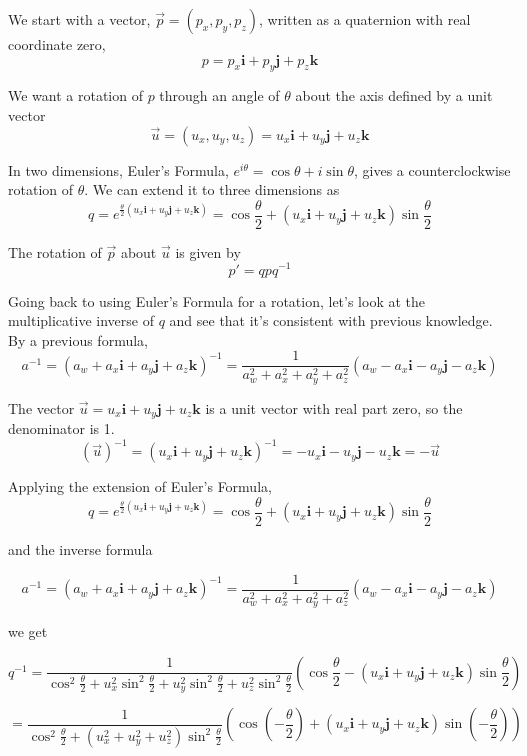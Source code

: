 \documentclass[12pt]{article}
\begin{document}
\begin{spacing}{1.2}
We start with a vector, $\vec{p} = (p_x, p_y, p_z)$, written as a quaternion with real coordinate zero, 
$$p = p_x \mathbf{i} + p_y \mathbf{j} + p_z \mathbf{k}$$

We want a rotation of $p$ through an angle of $\theta$ about the axis defined by a unit vector $$\vec{u} =  ( u_x, u_y, u_z ) = u_x \mathbf{i} + u_y \mathbf{j} + u_z \mathbf{k}$$ 

In two dimensions, Euler's Formula,  $e^{i\theta} = \cos \theta + i \sin \theta$, gives a counterclockwise rotation of $\theta$.  We can extend it to three dimensions as
$$q = e^{ 
	\frac{\theta}{2}
	( u_x \mathbf{i} + u_y \mathbf{j} + u_z \mathbf{k} )
	}
=
	\cos \frac{\theta}{2} + ( u_x \mathbf{i} + u_y \mathbf{j} + u_z \mathbf{k} ) \sin \frac{\theta}{2}
$$

The rotation of $\vec{p}$ about $\vec{u}$ is given by 
$$p' = q p q^{-1}$$

Going back to using Euler's Formula for a rotation, let's look at the multiplicative inverse of $q$ and see that it's consistent with previous knowledge.  By a previous formula, 
$$a^{-1} = (a_w + a_x \mathbf{i} + a_y \mathbf{j} + a_z \mathbf{k})^{-1} = 
\frac{1}{a_w^2 + a_x^2 + a_y^2 + a_z^2} (a_w - a_x \mathbf{i} - a_y \mathbf{j} - a_z \mathbf{k} )$$

The vector $\vec{u} = u_x \mathbf{i} + u_y \mathbf{j} + u_z \mathbf{k}$ is a unit vector with real part zero, so the denominator is 1.  
$$(\vec{u})^{-1} = (u_x \mathbf{i} + u_y \mathbf{j} + u_z \mathbf{k})^{-1} = -u_x \mathbf{i} - u_y \mathbf{j} - u_z \mathbf{k} = -\vec{u}$$

Applying the extension of Euler's Formula, 
$$q = e^{ 
	\frac{\theta}{2}
	( u_x \mathbf{i} + u_y \mathbf{j} + u_z \mathbf{k} )
	}
=
	\cos \frac{\theta}{2} + ( u_x \mathbf{i} + u_y \mathbf{j} + u_z \mathbf{k} ) \sin \frac{\theta}{2}
$$

and the inverse formula

$$a^{-1} = (a_w + a_x \mathbf{i} + a_y \mathbf{j} + a_z \mathbf{k})^{-1} = 
\frac{1}{a_w^2 + a_x^2 + a_y^2 + a_z^2} (a_w - a_x \mathbf{i} - a_y \mathbf{j} - a_z \mathbf{k} )$$

we get

$$q^{-1} = \frac{1}{
	\cos^2 \frac{\theta}{2}
	 + u_x^2 \sin ^2 \frac{\theta}{2}
	 + u_y^2 \sin ^2 \frac{\theta}{2}
	 + u_z^2 \sin ^2 \frac{\theta}{2}
	}
	\left(\cos \frac{\theta}{2} - ( u_x \mathbf{i} + u_y \mathbf{j} + u_z \mathbf{k} ) \sin \frac{\theta}{2}\right)
$$

$$ = \frac{1}{
	\cos^2 \frac{\theta}{2}
	 + (u_x^2 
	 + u_y^2 
	 + u_z^2) \sin ^2 \frac{\theta}{2}
	}
	\left(\cos \left( - \frac{\theta}{2} \right) + ( u_x \mathbf{i} + u_y \mathbf{j} + u_z \mathbf{k} ) \sin \left(-\frac{\theta}{2}\right)\right)
$$


\end{spacing}
\end{document}
